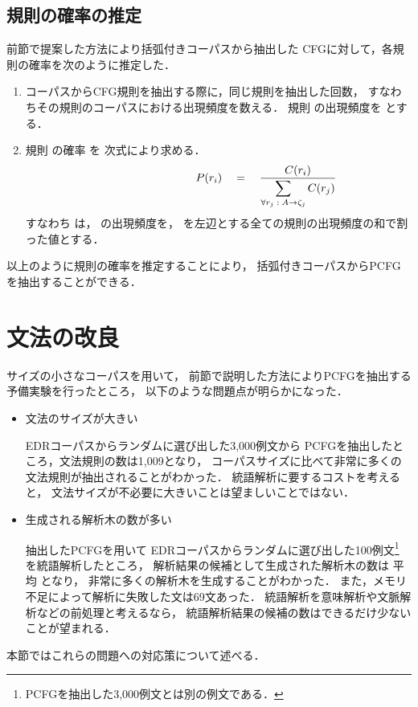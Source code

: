 \subsection{規則の確率の推定}
\label{sec:規則の確率の推定}

前節で提案した方法により括弧付きコーパスから抽出した
CFGに対して，各規則の確率を次のように推定した\cite{wetherell80a}．

\newpage
\begin{flushleft}
  \vspace*{2mm}{\bf 【規則の確率の推定】}\vspace*{-3mm}
\end{flushleft}

\begin{enumerate}
\item
  コーパスからCFG規則を抽出する際に，同じ規則を抽出した回数，
  すなわちその規則のコーパスにおける出現頻度を数える．
  規則  の出現頻度を  とする．

\item
  規則  の確率  を
  次式により求める．
  \begin{equation}
    \label{eq:規則の確率}
    \hspace*{30mm}
    P(r_i) \quad = \quad 
      \frac{C(r_i)}
           {\displaystyle
            \sum_{\forall r_j \;:\; A \rightarrow \zeta_j} C(r_j)}
  \end{equation}
  すなわち  は， の出現頻度を，
   を左辺とする全ての規則の出現頻度の和で割った値とする．
\end{enumerate}

以上のように規則の確率を推定することにより，
括弧付きコーパスからPCFGを抽出することができる．
\section{文法の改良}
\label{sec:文法の改良}

サイズの小さなコーパスを用いて，
前節で説明した方法によりPCFGを抽出する予備実験を行ったところ，
以下のような問題点が明らかになった．

\begin{itemize}


\item 文法のサイズが大きい

  \quad EDRコーパスからランダムに選び出した3,000例文から
  PCFGを抽出したところ，文法規則の数は1,009となり，
  コーパスサイズに比べて非常に多くの文法規則が抽出されることがわかった．
  統語解析に要するコストを考えると，
  文法サイズが不必要に大きいことは望ましいことではない．

\item 生成される解析木の数が多い

  \quad 抽出したPCFGを用いて
  EDRコーパスからランダムに選び出した100例文\footnote{
    PCFGを抽出した3,000例文とは別の例文である．
    }
  を統語解析したところ，
  解析結果の候補として生成された解析木の数は
  平均  となり，
  非常に多くの解析木を生成することがわかった．
  また，メモリ不足によって解析に失敗した文は69文あった．
  統語解析を意味解析や文脈解析などの前処理と考えるなら，
  統語解析結果の候補の数はできるだけ少ないことが望まれる．
\end{itemize}
本節ではこれらの問題への対応策について述べる．
